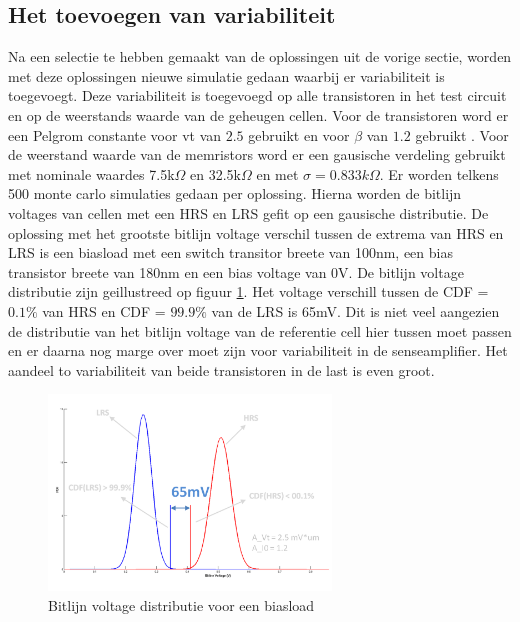 \subsection{Het toevoegen van variabiliteit}\label{sec:varload}
Na een selectie te hebben gemaakt van de oplossingen uit de vorige sectie, worden met deze oplossingen nieuwe simulatie gedaan waarbij er variabiliteit is toegevoegt. Deze variabiliteit is toegevoegd op alle transistoren in het test circuit en op de weerstands waarde van de geheugen cellen. Voor de transistoren word er een Pelgrom constante voor vt van $2.5$ gebruikt en voor $\beta$ van $1.2$ gebruikt \cite{ppt:variatie}. Voor de weerstand waarde van de memristors word er een gausische verdeling gebruikt met nominale waardes 7.5k$\Omega$ en 32.5k$\Omega$ en met $\sigma = 0.833k\Omega$. Er worden telkens 500 monte carlo simulaties gedaan per oplossing. Hierna worden de bitlijn voltages van cellen met een HRS en LRS gefit op een gausische distributie. De oplossing met het grootste bitlijn voltage verschil tussen de extrema van HRS en LRS is een biasload met een switch transitor breete van 100nm, een bias transistor breete van 180nm en een bias voltage van 0V. De bitlijn voltage distributie zijn geillustreed op figuur \ref{fig:distbias}. Het voltage verschill tussen de CDF = $0.1\%$ van HRS en CDF = $99.9\%$ van de LRS is 65mV. Dit is niet veel aangezien de distributie van het bitlijn voltage van de referentie cell hier tussen moet passen en er daarna nog marge over moet zijn voor variabiliteit in de senseamplifier. Het aandeel to variabiliteit van beide transistoren in de last is even groot.

\begin{figure}[!ht]
  \centering
  \includegraphics[width=0.67\textwidth]{../fig/hfdst-last-var1.png}
  \caption{Bitlijn voltage distributie voor een biasload}
  \label{fig:distbias}
\end{figure}

